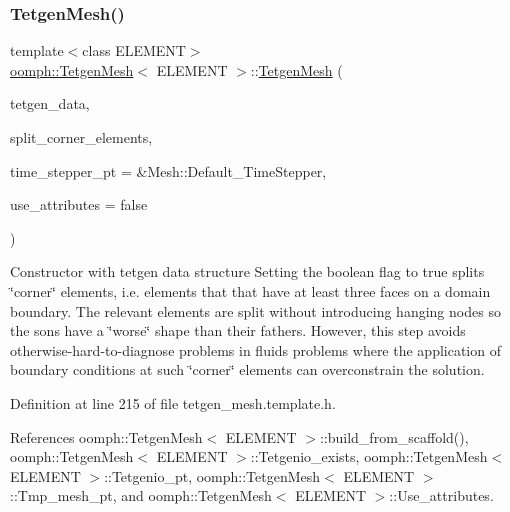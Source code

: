 \mbox{\label{classoomph_1_1TetgenMesh_a0fa783641ea515a942941425c468df01}} 
\subsubsection{\texorpdfstring{Tetgen\+Mesh()}{TetgenMesh()}\hspace{0.1cm}{\footnotesize\ttfamily [5/6]}}
{\footnotesize\ttfamily template$<$class E\+L\+E\+M\+E\+NT$>$ \\
\hyperlink{classoomph_1_1TetgenMesh}{oomph\+::\+Tetgen\+Mesh}$<$ E\+L\+E\+M\+E\+NT $>$\+::\hyperlink{classoomph_1_1TetgenMesh}{Tetgen\+Mesh} (\begin{DoxyParamCaption}\item[{tetgenio \&}]{tetgen\+\_\+data,  }\item[{const bool \&}]{split\+\_\+corner\+\_\+elements,  }\item[{Time\+Stepper $\ast$}]{time\+\_\+stepper\+\_\+pt = {\ttfamily \&Mesh\+:\+:Default\+\_\+TimeStepper},  }\item[{const bool \&}]{use\+\_\+attributes = {\ttfamily false} }\end{DoxyParamCaption})\hspace{0.3cm}{\ttfamily [inline]}}



Constructor with tetgen data structure Setting the boolean flag to true splits \char`\"{}corner\char`\"{} elements, i.\+e. elements that that have at least three faces on a domain boundary. The relevant elements are split without introducing hanging nodes so the sons have a \char`\"{}worse\char`\"{} shape than their fathers. However, this step avoids otherwise-\/hard-\/to-\/diagnose problems in fluids problems where the application of boundary conditions at such \char`\"{}corner\char`\"{} elements can overconstrain the solution. 



Definition at line 215 of file tetgen\+\_\+mesh.\+template.\+h.



References oomph\+::\+Tetgen\+Mesh$<$ E\+L\+E\+M\+E\+N\+T $>$\+::build\+\_\+from\+\_\+scaffold(), oomph\+::\+Tetgen\+Mesh$<$ E\+L\+E\+M\+E\+N\+T $>$\+::\+Tetgenio\+\_\+exists, oomph\+::\+Tetgen\+Mesh$<$ E\+L\+E\+M\+E\+N\+T $>$\+::\+Tetgenio\+\_\+pt, oomph\+::\+Tetgen\+Mesh$<$ E\+L\+E\+M\+E\+N\+T $>$\+::\+Tmp\+\_\+mesh\+\_\+pt, and oomph\+::\+Tetgen\+Mesh$<$ E\+L\+E\+M\+E\+N\+T $>$\+::\+Use\+\_\+attributes.

